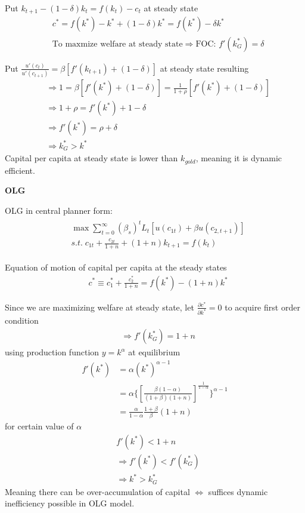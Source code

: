 \documentclass{article}
\begin{document}
Put $k_{t+1}-(1-\delta)k_t=f(k_t)-c_t$ at steady state
\begin{align}
&c^*=f(k^*)-k^*+(1-\delta)k^*=f(k^*)-\delta k^*
\\& \text{To maxmize welfare at steady state}\Rightarrow \text{FOC: } f'(k^{*}_{G})=\delta
\end{align}

Put $\frac{u'(c_{t})}{u'(c_{t+1})}=\beta[f'(k_{t+1})+(1-\delta)]$ at steady state resulting
\begin{align}
&\Rightarrow 1= \beta [f'(k^{*})+(1-\delta)] =\frac{1}{1+\rho} [f'(k^{*})+(1-\delta)] 
\\&\Rightarrow 1+\rho=f'(k^{*})+1- \delta
\\&\Rightarrow f'(k^{*})=\rho +\delta 
\\&\Rightarrow k^{*}_{G}>k^{*}
\end{align}
Capital per capita at steady state is lower than $k_{gold}$, meaning it is dynamic efficient.

\textbf{OLG}

OLG in central planner form:
\begin{align}
\begin{split}
&\max \sum\limits_{t=0}^{\infty}({\beta_{s}})^{t}L_{t}[u(c_{1t})+\beta u(c_{2,t+1})]
\\&s.t. \; 
c_{1t}+\frac{c_{2t}}{1+n}+(1+n)k_{t+1}=f(k_{t})
\end{split}
\end{align}

Equation of motion of capital per capita at the steady states
\begin{align}
&c^{*}\equiv c_{1}^{*}+\frac{c_{2}^{*}}{1+n}=f(k^{*})-(1+n)k^{*}
\end{align}

Since we are maximizing welfare at steady state, let $\frac{\partial  c^{*}}{\partial  k^{*}}=0$ to acquire first order condition
\begin{align}
&\Rightarrow f'(k^{*}_{G})=1+n
\end{align}
using production function $y=k^\alpha$ at equilibrium
\begin{align}
f'(k^{*})&=\alpha (k^{*})^{\alpha-1}
\\&=\alpha\{[\frac{\beta(1-\alpha)}{(1+\beta)(1+n)}]^{\frac{1}{1-\alpha}}\}^{\alpha-1}
\\&=\frac{\alpha}{1-\alpha}\frac{1+\beta}{\beta}(1+n)
\end{align}
for certain value of $\alpha$
\begin{align}
&f'(k^{*})<1+n
\\&\Rightarrow f'(k^{*})<f'(k^{*}_{G})
\\& \Rightarrow k^{*}>k^{*}_{G}
\end{align}
Meaning there can be over-accumulation of capital $\iff$ suffices dynamic inefficiency possible in OLG model.
\end{document}
